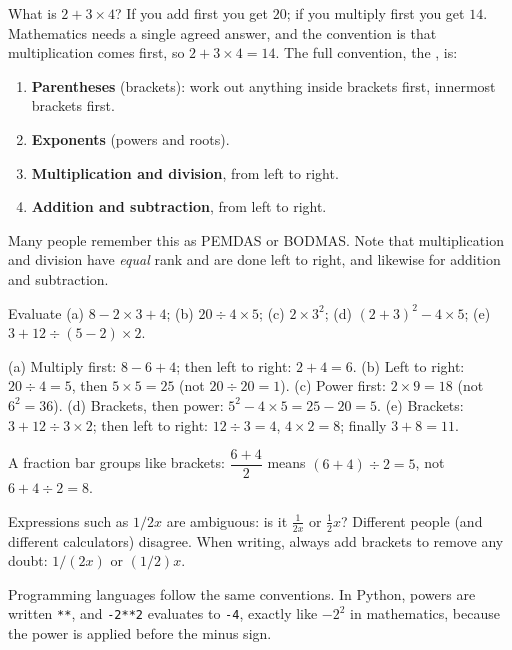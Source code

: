 What is $2 + 3 \times 4$? If you add first you get $20$; if you multiply first
you get $14$. Mathematics needs a single agreed answer, and the convention is
that multiplication comes first, so $2 + 3\times 4 = 14$. The full convention,
the , is:

\begin{enumerate}[label=\arabic*.]
  \item \textbf{Parentheses} (brackets): work out anything inside brackets
    first, innermost brackets first.
  \item \textbf{Exponents} (powers and roots).
  \item \textbf{Multiplication and division}, from left to right.
  \item \textbf{Addition and subtraction}, from left to right.
\end{enumerate}

Many people remember this as PEMDAS or BODMAS. Note that multiplication and
division have \emph{equal} rank and are done left to right, and likewise for
addition and subtraction.

\begin{example}
Evaluate (a) $8 - 2 \times 3 + 4$; (b) $20 \div 4 \times 5$;
(c) $2 \times 3^2$; (d) $(2+3)^2 - 4 \times 5$;
(e) $3 + 12 \div (5 - 2) \times 2$.

\sol
(a) Multiply first: $8 - 6 + 4$; then left to right: $2 + 4 = 6$.
(b) Left to right: $20 \div 4 = 5$, then $5 \times 5 = 25$ (not
$20 \div 20 = 1$).
(c) Power first: $2 \times 9 = 18$ (not $6^2 = 36$).
(d) Brackets, then power: $5^2 - 4\times5 = 25 - 20 = 5$.
(e) Brackets: $3 + 12 \div 3 \times 2$; then left to right:
$12\div3 = 4$, $4\times2 = 8$; finally $3 + 8 = 11$.
\end{example}

A fraction bar groups like brackets: $\dfrac{6 + 4}{2}$ means $(6+4) \div 2 =
5$, not $6 + 4 \div 2 = 8$.

\begin{pitfall}
Expressions such as $1/2x$ are ambiguous: is it $\tfrac{1}{2x}$ or
$\tfrac12 x$? Different people (and different calculators) disagree. When
writing, always add brackets to remove any doubt: $1/(2x)$ or $(1/2)x$.
\end{pitfall}

\begin{remark}
Programming languages follow the same conventions. In Python, powers are
written \texttt{**}, and \texttt{-2**2} evaluates to \texttt{-4}, exactly like
$-2^2$ in mathematics, because the power is applied before the minus sign.
\end{remark}

